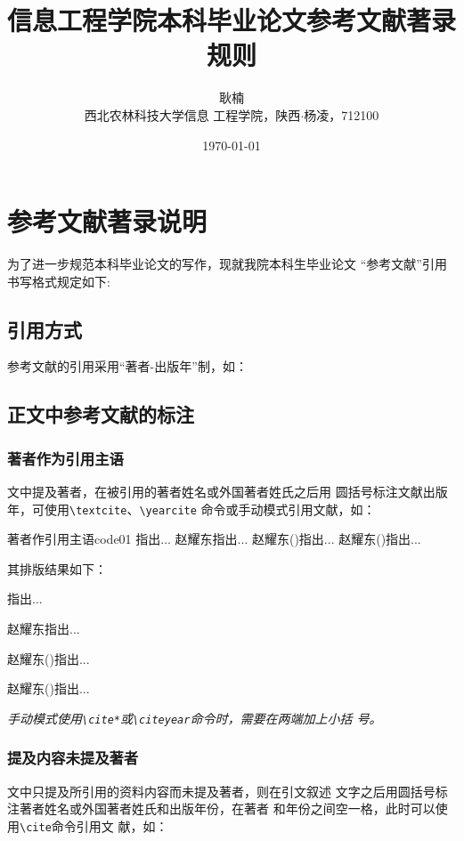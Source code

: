 \documentclass{ctexbook}
\title{\Large \heiti 信息工程学院本科毕业论文参考文献著录规则}
\author{\zihao{4} \fangsong 耿楠\\\small \songti 西北农林科技大学信息
  工程学院，陕西$\cdot$杨凌，712100}
\date{\today}
\newcommand\cs[1]{\texttt{\textbackslash#1}}
\newcommand{\note}[1]{{%
  \color{magenta}{\bfseries 注意：}\emph{#1}}}
\begin{document}
\chapter{参考文献著录说明}

为了进一步规范本科毕业论文的写作，现就我院本科生毕业论文
\enquote{参考文献}引用书写格式规定如下:

\section{引用方式}
参考文献的引用采用\enquote{著者-出版年}制，如：

\section{正文中参考文献的标注}
\subsection{著者作为引用主语}
文中提及著者，在被引用的著者姓名或外国著者姓氏之后用
圆括号标注文献出版年，可使用\cs{textcite}、\cs{yearcite}
命令或手动模式引用文献，如：

\begin{codetex}{著者作引用主语}{code01}
  \textcite{赵耀东1998--}指出...
  赵耀东指出...
  赵耀东(\cite*{赵耀东1998--})指出...
  赵耀东(\citeyear{赵耀东1998--})指出...
\end{codetex}

其排版结果如下：

\begin{center}
  \begin{boxedminipage}{0.8\textwidth}
    \small
    \textcite{赵耀东1998--}指出...

    赵耀东指出...

    赵耀东(\cite*{赵耀东1998--})指出...

    赵耀东(\citeyear{赵耀东1998--})指出...
  \end{boxedminipage}
\end{center}

\note{手动模式使用\cs{cite*}或\cs{citeyear}命令时，需要在两端加上小括
  号。}

\subsection{提及内容未提及著者}

文中只提及所引用的资料内容而未提及著者，则在引文叙述
文字之后用圆括号标注著者姓名或外国著者姓氏和出版年份，在著者
和年份之间空一格，此时可以使用\cs{cite}命令引用文
献，如：
\end{document}
